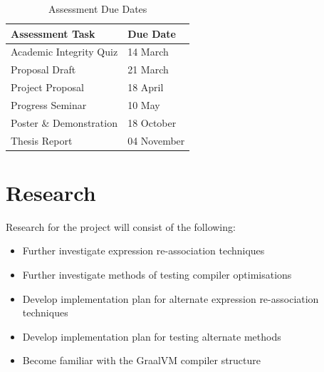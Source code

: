 \documentclass[12pt,openany,a4paper]{book}
\begin{document}
\begin{table}[ht]
    \centering
    \begin{tabular}{ |p{8cm}|p{4cm}| }
        \hline
        \textbf{Assessment Task} & \textbf{Due Date}\\
        \hline
        Academic Integrity Quiz & 14 March\\
        \hline
        Proposal Draft & 21 March\\
        \hline
        Project Proposal & 18 April\\
        \hline
        Progress Seminar & 10 May\\
        \hline
        Poster \& Demonstration & 18 October\\
        \hline
        Thesis Report & 04 November\\
        \hline
    \end{tabular}
    \caption{Assessment Due Dates}
    \label{duedates}
\end{table}


\section{Research}
\label{research}

Research for the project will consist of the following:

\begin{itemize}
\item Further investigate expression re-association techniques
\item Further investigate methods of testing compiler optimisations
\item Develop implementation plan for alternate expression re-association techniques
\item Develop implementation plan for testing alternate methods
\item Become familiar with the GraalVM compiler structure
\end{itemize}
\end{document}
